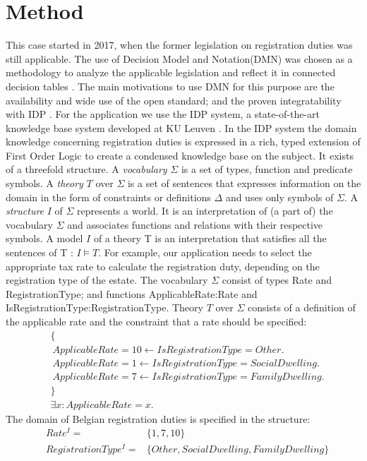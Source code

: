 \section{Method}
This case started in 2017, when the former legislation on registration duties was still applicable.
The use of Decision Model and Notation(DMN) was chosen as a methodology to analyze the applicable legislation and reflect it in connected decision tables \cite{DMN}. 
The main motivations to use DMN for this purpose are the availability and wide use of the open standard; and the proven integratability with IDP \cite{Ingmar}.
For the application we use the IDP system, a state-of-the-art knowledge base system developed at KU Leuven \cite{IDP}.
In the IDP system the domain knowledge concerning registration duties is expressed in a rich, typed extension of First Order Logic to create a condensed knowledge base on the subject. 
It exists of a threefold structure.
A \textit{vocabulary} $\Sigma$ is a set of types, function and predicate symbols.
A \textit{theory } $T$ over $\Sigma$ is a set of sentences that expresses information on the domain in the form of constraints or definitions $\Delta$ and uses only symbols of $\Sigma$.
A \textit{structure} $I$ of $\Sigma$ represents a world.
It is an interpretation of (a part of) the vocabulary $\Sigma$ and associates functions and relations with their respective symbols.
A model $I$ of a theory T is an interpretation that satisfies all the sentences of T : $I \models T$.
For example, our application needs to select the appropriate tax rate to calculate the registration duty, depending on the registration type of the estate.
The vocabulary $\Sigma$ consist of types Rate and RegistrationType; and functions ApplicableRate:Rate and IsRegistrationType:RegistrationType.
Theory $T$ over $\Sigma$ consists of a definition of the applicable rate and the constraint that a rate should be specified:
\begin{align*}
& \{ \\
& ~ ApplicableRate = 10 \leftarrow IsRegistrationType = Other. \\
& ~ ApplicableRate = 1 \leftarrow IsRegistrationType = SocialDwelling. \\
& ~ ApplicableRate = 7 \leftarrow IsRegistrationType = FamilyDwelling. \\
& \} \\
& \exists x\colon ApplicableRate = x.
\end{align*}
The domain of Belgian registration duties is specified in the structure:
\begin{align*}
& Rate^I =& \{ 1,7,10\} \\
& RegistrationType^I =&\{Other,SocialDwelling,FamilyDwelling\}
\end{align*}


